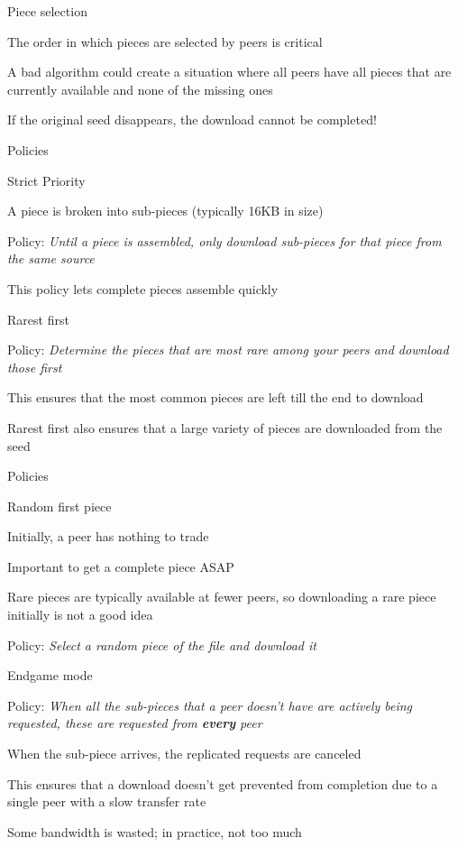 \begin{frame}{Piece selection}
\BIL
\item The order in which pieces are selected by peers is critical
\item A bad algorithm could create a situation where all peers have all pieces that are currently
 available and none of the missing ones
\item If the original seed disappears, the download cannot be completed!
\EIL
\end{frame}

\begin{frame}{Policies}
	
\BIL
\item \alert{Strict Priority}
\BI
\item A piece is broken into sub-pieces (typically 16KB in size)
\item Policy: \textit{Until a piece is assembled, only download sub-pieces for that piece from the same source}
\item This policy lets complete pieces assemble quickly
\EI
\item \alert{Rarest first}
\BI
\item Policy: \textit{Determine the pieces that are most rare among your peers and download those first}
\item This ensures that the most common pieces are left till the end to download
\item Rarest first also ensures that a large variety of pieces are downloaded from the seed	
\EI
\EIL

\end{frame}

\begin{frame}{Policies}

\BIL
\item \alert{Random first piece}
\BI
\item Initially, a peer has nothing to trade
\item Important to get a complete piece ASAP
\item Rare pieces are typically available at fewer peers, so downloading a rare piece initially is not a good idea
\item Policy: \textit{Select a random piece of the file and download it}
\EI
\item \alert{Endgame mode}
\BI
\item Policy: \emph{When all the sub-pieces that a peer doesn't have are actively being requested, these are requested from \textbf{every} peer}
\item When the sub-piece arrives, the replicated requests are canceled
\item This ensures that a download doesn't get prevented from completion due to a single peer with a slow transfer rate
\item Some bandwidth is wasted; in practice, not too much
\EI
\EIL
\end{frame}

